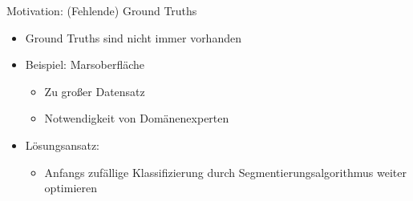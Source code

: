 \documentclass{beamer}
\begin{document}
\begin{frame}{Motivation: (Fehlende) Ground Truths}
	\begin{minipage}{0.68\textwidth}
\begin{itemize}
	\item Ground Truths sind nicht immer vorhanden
	\item Beispiel: Marsoberfläche
	\begin{itemize}
		\item Zu großer Datensatz
		\item Notwendigkeit von Domänenexperten
	\end{itemize}
	\item Lösungsansatz:
	\begin{itemize}
		\item Anfangs zufällige Klassifizierung durch Segmentierungsalgorithmus weiter optimieren
	\end{itemize}
\end{itemize}


\end{minipage}
\end{frame}
\end{document}
